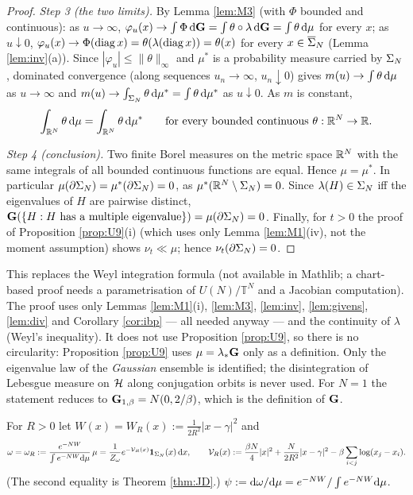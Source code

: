 \begin{proof}
\emph{Step 3 (the two limits).} By Lemma \ref{lem:M3} (with $\Phi$ bounded and continuous):
as $u\to\infty$, $\varphi_u(x)\to\int\Phi\,\mathrm{d}\mathbf{G}=\int\theta\circ\lambda\,\mathrm{d}\mathbf{G}=\int\theta\,\mathrm{d}\mu$ for every $x$; as $u\downarrow0$, $\varphi_u(x)\to\Phi(\operatorname{diag} x)=\theta(\lambda(\operatorname{diag} x))=\theta(x)$ for every $x\in\overline{\Sigma}_N$ (Lemma \ref{lem:inv}(a)).
Since $|\varphi_u|\le\|\theta\|_\infty$ and $\mu^*$ is a probability measure carried by $\Sigma_N$, dominated convergence (along sequences $u_n\to\infty$, $u_n\downarrow0$) gives $m(u)\to\int\theta\,\mathrm{d}\mu$ as $u\to\infty$ and $m(u)\to\int_{\Sigma_N}\theta\,\mathrm{d}\mu^*=\int\theta\,\mathrm{d}\mu^*$ as $u\downarrow0$. As $m$ is constant,
\[\int_{\mathbb{R}^N}\theta\,\mathrm{d}\mu=\int_{\mathbb{R}^N}\theta\,\mathrm{d}\mu^*\qquad\text{for every bounded continuous }\theta:\mathbb{R}^N\to\mathbb{R} .\]

\emph{Step 4 (conclusion).} Two finite Borel measures on the metric space $\mathbb{R}^N$ with the same integrals of all bounded continuous functions are equal. Hence $\mu=\mu^*$.
In particular $\mu(\partial\Sigma_N)=\mu^*(\partial\Sigma_N)=0$, as $\mu^*(\mathbb{R}^N\setminus\Sigma_N)=0$. Since $\lambda(H)\in\Sigma_N$ iff the eigenvalues of $H$ are pairwise distinct, $\mathbf{G}(\{H:H\text{ has a multiple eigenvalue}\})=\mu(\partial\Sigma_N)=0$.
Finally, for $t>0$ the proof of Proposition \ref{prop:U9}(i) (which uses only Lemma \ref{lem:M1}(iv), not the moment assumption) shows $\nu_t\ll\mu$; hence $\nu_t(\partial\Sigma_N)=0$.
\end{proof}

\begin{remark}
This replaces the Weyl integration formula (not available in Mathlib; a chart-based proof needs a parametrisation of $U(N)/\mathbb T^N$ and a Jacobian computation). The proof uses only Lemmas \ref{lem:M1}(i), \ref{lem:M3}, \ref{lem:inv}, \ref{lem:givens}, \ref{lem:div} and Corollary \ref{cor:ibp} --- all needed anyway --- and the continuity of $\lambda$ (Weyl's inequality).
It does not use Proposition \ref{prop:U9}, so there is no circularity: Proposition \ref{prop:U9} uses $\mu=\lambda_*\mathbf{G}$ only as a definition.
Only the eigenvalue law of the \emph{Gaussian} ensemble is identified; the disintegration of Lebesgue measure on $\mathcal{H}$ along conjugation orbits is never used.
For $N=1$ the statement reduces to $\mathbf{G}_{1,\beta}=N(0,2/\beta)$, which is the definition of $\mathbf{G}$.
\end{remark}

\begin{definition}\label{def:omega}
For $R>0$ let $W(x)=W_R(x):=\frac1{2R^2}|x-\gamma|^2$ and
\begin{equation}\label{omega}
\omega=\omega_R:=\frac{e^{-NW}}{\int e^{-NW}\mathrm{d}\mu}\,\mu=\frac{1}{Z_\omega}e^{-\mathcal{V}_R(x)}\mathbf 1_{\Sigma_N}(x)\,\mathrm{d} x,\qquad \mathcal{V}_R(x):=\frac{\beta N}{4}|x|^2+\frac{N}{2R^2}|x-\gamma|^2-\beta\sum_{i<j}\log(x_j-x_i).
\end{equation}
(The second equality is Theorem \ref{thm:JD}.) $\psi:=\mathrm{d}\omega/\mathrm{d}\mu=e^{-NW}/\int e^{-NW}\mathrm{d}\mu$.
\end{definition}

